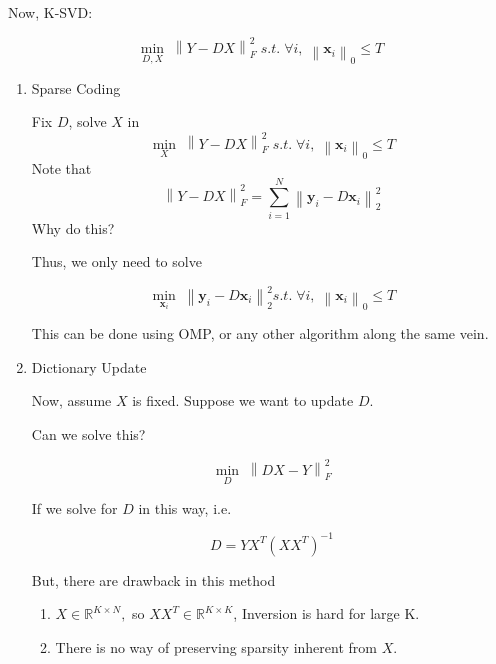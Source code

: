 \documentclass[11pt]{article}
\begin{document}
Now, K-SVD:

\begin{equation}
\mathop {\min }\limits_{D,X} \;\left\| {Y - DX} \right\|_F^2\;s.t.\;\forall i,\;{\left\| {{\boldsymbol{x}_i}} \right\|_0} \le  T
\end{equation}

\begin{enumerate}
	\item Sparse Coding
	
	Fix $ D $, solve $ X $ in 
	\begin{equation}
	\mathop {\min }\limits_X \;\left\| {Y - DX} \right\|_F^2\;s.t.\;\forall i,\;{\left\| {{\boldsymbol{x}_i}} \right\|_0} \le T
	\end{equation}
	Note that
	\begin{equation}
	\left\| {Y - DX} \right\|_F^2 = \sum\limits_{i = 1}^N {\left\| {{\boldsymbol{y}_i} - D{\boldsymbol{x}_i}} \right\|_2^2} 
	\end{equation}
	Why do this?
	
	Thus, we only need to solve 
	
	\begin{equation}
	\mathop {\min }\limits_{{\boldsymbol{x}_i}} \;\left\| {{\boldsymbol{y}_i} - D{\boldsymbol{x}_i}} \right\|_2^2s.t.\;\forall i,\;{\left\| {{\boldsymbol{x}_i}} \right\|_0} \leqslant T
	\end{equation}
	
	This can be done using OMP, or any other algorithm along the same vein. 
	\item Dictionary Update
	
	Now, assume $ X $ is fixed. Suppose we want to update $ D $.
	
	Can we solve this?
	
	\begin{equation}
	\mathop {\min }\limits_D \;\left\| {DX - Y} \right\|_F^2
	\end{equation}
	
	If we solve for $ D $ in this way, i.e.
	
	\begin{equation}
	D = Y{X^T}{\left( {X{X^T}} \right)^{ - 1}}
	\end{equation}
	
	But, there are drawback in this method
	\begin{enumerate}
		\item $ X \in \mathbb{R}^{K\times N}, $ so $ XX^{T} \in \mathbb{R}^{K\times K} $, Inversion is hard for large K.
		\item There is no way of preserving sparsity inherent from $ X $. 
	\end{enumerate}
	

\end{enumerate}
\end{document}
